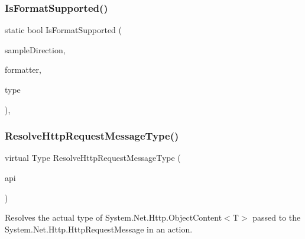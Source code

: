 \subsubsection{\texorpdfstring{Is\+Format\+Supported()}{IsFormatSupported()}}
{\footnotesize\ttfamily static bool Is\+Format\+Supported (\begin{DoxyParamCaption}\item[{\hyperlink{namespaceApi3Layers_1_1Areas_1_1HelpPage_abad9f6d2b059d72558bf70415efc32b5}{Sample\+Direction}}]{sample\+Direction,  }\item[{Media\+Type\+Formatter}]{formatter,  }\item[{Type}]{type }\end{DoxyParamCaption})\hspace{0.3cm}{\ttfamily [static]}, {\ttfamily [private]}}

\mbox{\label{classApi3Layers_1_1Areas_1_1HelpPage_1_1HelpPageSampleGenerator_a74ffe7b081131a8417acace964c1ea1c}} 
\subsubsection{\texorpdfstring{Resolve\+Http\+Request\+Message\+Type()}{ResolveHttpRequestMessageType()}}
{\footnotesize\ttfamily virtual Type Resolve\+Http\+Request\+Message\+Type (\begin{DoxyParamCaption}\item[{Api\+Description}]{api }\end{DoxyParamCaption})\hspace{0.3cm}{\ttfamily [virtual]}}



Resolves the actual type of System.\+Net.\+Http.\+Object\+Content$<$\+T$>$ passed to the System.\+Net.\+Http.\+Http\+Request\+Message in an action. 


